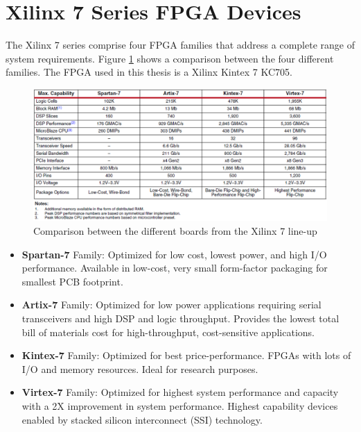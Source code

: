 \section{Xilinx 7 Series FPGA Devices}
\noindent The Xilinx 7 series comprise four FPGA families that address a complete range of system requirements.
Figure \ref{fig:kintex72} shows a comparison between the four different families.
The FPGA used in this thesis is a Xilinx Kintex 7 KC705\cite{xilinx7}.
\begin{figure}[H]
	\centering
	\includegraphics[width=0.8\linewidth]{IMG/ch3/KINTEX72}
	\caption{Comparison between the different boards from the Xilinx 7 line-up}
	\label{fig:kintex72}
\end{figure}
\begin{itemize}
	\item  \textbf{Spartan-7} Family: Optimized for low cost, lowest power, and high
	I/O performance. Available in low-cost, very small form-factor
	packaging for smallest PCB footprint.
	\item \textbf{Artix-7} Family: Optimized for low power applications requiring serial
	transceivers and high DSP and logic throughput. Provides the lowest
	total bill of materials cost for high-throughput, cost-sensitive
	applications.
	\item \textbf{Kintex-7} Family: Optimized for best price-performance. FPGAs with lots of I/O and memory resources. Ideal for research purposes.
	\item \textbf{Virtex-7} Family: Optimized for highest system performance and
	capacity with a 2X improvement in system performance. Highest
	capability devices enabled by stacked silicon interconnect (SSI)
	technology.
\end{itemize}
